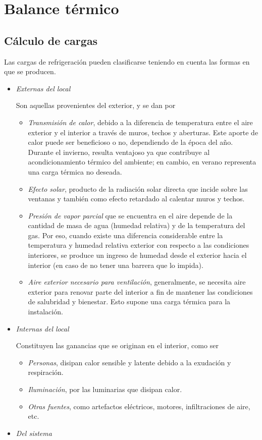 \chapter{Balance térmico}
\minitoc



\section{Cálculo de cargas}

Las cargas de refrigeración pueden clasificarse teniendo en cuenta las formas en que se producen.
\begin{itemize}
	\item \textit{Externas del local}
	
	Son aquellas provenientes del exterior, y se dan por
	\begin{itemize}
		\item \textsl{Transmisión de calor}, debido a la diferencia de temperatura entre el aire exterior y el interior a través de muros, techos y aberturas. 
		Este aporte de calor puede ser beneficioso o no, dependiendo de la época del año. Durante el invierno, resulta ventajoso ya que contribuye al acondicionamiento térmico del ambiente; en cambio, en verano representa una carga térmica no deseada.
		\item \textsl{Efecto solar}, producto de la radiación solar directa que incide sobre las ventanas y también como efecto retardado al calentar muros y techos.
		\item \textsl{Presi\'on de vapor parcial} que se encuentra en el aire depende de la cantidad de masa de agua (humedad relativa) y de la temperatura del gas. Por eso, cuando existe una diferencia considerable entre la temperatura y humedad relativa exterior con respecto a las condiciones interiores, se produce un ingreso de humedad desde el exterior hacia el interior (en caso de no tener una barrera que lo impida).
		\item \textsl{Aire exterior necesario para ventilaci\'on}, generalmente, se necesita aire exterior para renovar parte del interior a fin de mantener las condiciones de salubridad y bienestar. Esto supone una carga t\'ermica para la instalaci\'on.
	\end{itemize}
	\item \textit{Internas del local}
	
	Constituyen las ganancias que se originan en el interior, como ser\begin{itemize}
		\item \textsl{Personas}, disipan calor sensible y latente debido a la exudación y respiración.
		\item \textsl{Iluminación}, por las luminarias que disipan calor.
		\item \textsl{Otras fuentes}, como artefactos eléctricos, motores, infiltraciones de aire, etc.
	\end{itemize}
	\item \textit{Del sistema}
	

\end{itemize}
